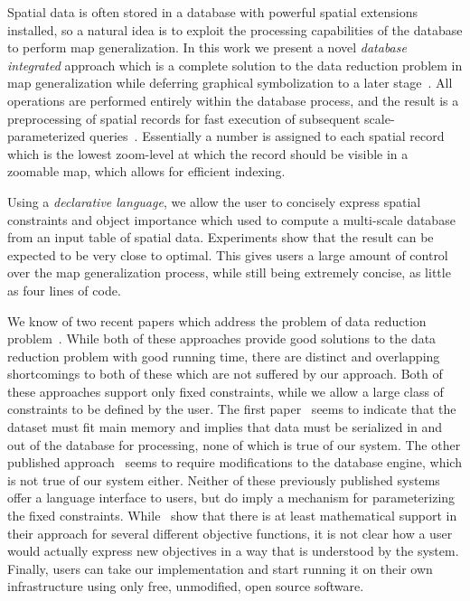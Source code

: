 Spatial data is often stored in a database with powerful spatial extensions installed, so a natural idea is to exploit the processing capabilities of the database to perform map generalization. In this work we present a novel \emph{database integrated} approach which is a complete solution to the data reduction problem in map generalization while deferring graphical symbolization to a later stage~\cite{gaffuri12vectortiles}. All operations are performed entirely within the database process, and the result is a preprocessing of spatial records for fast execution of subsequent scale-parameterized queries~\cite{hilbert1891ueber}. Essentially a number is assigned to each spatial record which is the lowest zoom-level at which the record should be visible in a zoomable map, which allows for efficient indexing.

Using a \emph{declarative language}, we allow the user to concisely express spatial constraints and object importance which used to compute a multi-scale database from an input table of spatial data. Experiments show that the result can be expected to be very close to optimal. This gives users a large amount of control over the map generalization process, while still being extremely concise, as little as four lines of code.

We know of two recent papers which address the problem of data reduction problem~\cite{nutanong2012multiresolution,sarma2012fusiontables}. While both of these approaches provide good solutions to the data reduction problem with good running time, there are distinct and overlapping shortcomings to both of these which are not suffered by our approach.  Both of these approaches support only fixed constraints, while we allow a large class of constraints to be defined by the user. The first paper~\cite{sarma2012fusiontables} seems to indicate that the dataset must fit main memory and implies that data must be serialized in and out of the database for processing, none of which is true of our system. The other published approach~\cite{nutanong2012multiresolution} seems to require modifications to the database engine, which is not true of our system either. Neither of these previously published systems offer a language interface to users, but do imply a mechanism for parameterizing the fixed constraints. While~\cite{sarma2012fusiontables} show that there is at least mathematical support in their approach for several different objective functions, it is not clear how a user would actually express new objectives in a way that is understood by the system. Finally, users can take our implementation and start running it on their own infrastructure using only free, unmodified, open source software.

